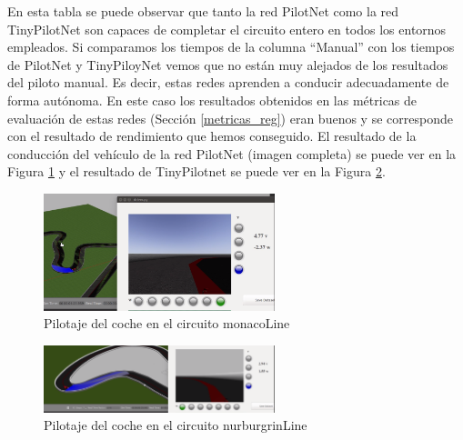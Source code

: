 En esta tabla se puede observar que tanto la red PilotNet como la red TinyPilotNet son capaces de completar el circuito entero en todos los entornos empleados. Si comparamos los tiempos de la columna ``Manual'' con los tiempos de PilotNet y TinyPiloyNet vemos que no están muy alejados de los resultados del piloto manual. Es decir, estas redes aprenden a conducir adecuadamente de forma autónoma. En este caso los resultados obtenidos en las métricas de evaluación de estas redes (Sección \ref{metricas_reg}) eran buenos y se corresponde con el resultado de rendimiento que hemos conseguido. El resultado de la conducción del vehículo de la red PilotNet (imagen completa) se puede ver en la Figura \ref{fig.monaco_reg} y el resultado de TinyPilotnet se puede ver en la Figura \ref{fig.nurburgrin_reg}.\\

\begin{figure}
\begin{center}
	\includegraphics[width=0.6\textwidth]{figures/Regresion/monaco_reg.png}
   \caption{Pilotaje del coche en el circuito monacoLine}
	\label{fig.monaco_reg}
\end{center}
\end{figure}

\begin{figure}
\begin{center}
	\includegraphics[width=0.6\textwidth]{figures/Regresion/tinypilotnet_completa.png}
   \caption{Pilotaje del coche en el circuito nurburgrinLine}
	\label{fig.nurburgrin_reg}
\end{center}
\end{figure}



